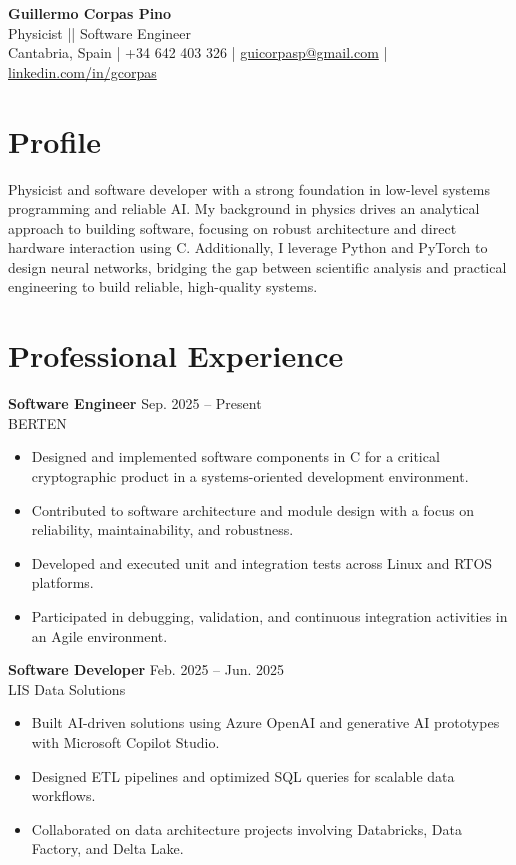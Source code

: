 \documentclass[11pt,a4paper]{article}
\begin{document}
{\LARGE \textbf{Guillermo Corpas Pino}}\\
\vspace{4pt}
Physicist || Software Engineer\\
Cantabria, Spain \quad | \quad +34 642 403 326 \quad | \quad
\href{mailto:guicorpasp@gmail.com}{guicorpasp@gmail.com} \quad | \quad
\href{https://www.linkedin.com/in/gcorpas}{linkedin.com/in/gcorpas}

\section*{Profile}
Physicist and software developer with a strong foundation in low-level systems programming and reliable AI. My background in physics drives an analytical approach to building software, focusing on robust architecture and direct hardware interaction using C. Additionally, I leverage Python and PyTorch to design neural networks, bridging the gap between scientific analysis and practical engineering to build reliable, high-quality systems.

\section*{Professional Experience}

\textbf{Software Engineer} \hfill Sep. 2025 -- Present\\
BERTEN
\begin{itemize}
\item Designed and implemented software components in C for a critical cryptographic product in a systems-oriented development environment.
\item Contributed to software architecture and module design with a focus on reliability, maintainability, and robustness.
\item Developed and executed unit and integration tests across Linux and RTOS platforms.
\item Participated in debugging, validation, and continuous integration activities in an Agile environment.
\end{itemize}

\textbf{Software Developer} \hfill Feb. 2025 -- Jun. 2025\\
LIS Data Solutions
\begin{itemize}
\item Built AI-driven solutions using Azure OpenAI and generative AI prototypes with Microsoft Copilot Studio.
\item Designed ETL pipelines and optimized SQL queries for scalable data workflows.
\item Collaborated on data architecture projects involving Databricks, Data Factory, and Delta Lake.
\end{itemize}
\end{document}
